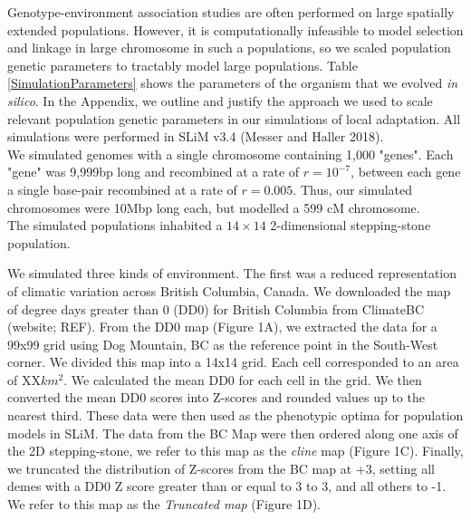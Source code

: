 \documentclass[11pt,twoside,lineno]{GSA_format}
\begin{document}
Genotype-environment association studies are often performed on large spatially extended populations. However, it is computationally infeasible to model selection and linkage in large chromosome in such a populations, so we scaled population genetic parameters to tractably model large populations. Table \ref{SimulationParameters} shows the parameters of the organism that we evolved \textit{in silico}. In the Appendix, we outline and justify the approach we used to scale relevant population genetic parameters in our simulations of local adaptation. All simulations were performed in SLiM v3.4 (Messer and Haller 2018). \\
 
We simulated genomes with a single chromosome containing 1,000 "genes". Each "gene" was 9,999bp long and recombined at a rate of $r = 10^{-7}$, between each gene a single base-pair recombined at a rate of $r = 0.005$. Thus, our simulated chromosomes were 10Mbp long each, but modelled a 599 cM chromosome. \\

The simulated populations inhabited a $14\times14$ 2-dimensional stepping-stone population.


We simulated three kinds of environment. The first was a reduced representation of climatic variation across British Columbia, Canada. We downloaded the map of degree days greater than 0 (DD0) for British Columbia from ClimateBC (website; REF). From the DD0 map (Figure 1A), we extracted the data for a 99x99 grid using Dog Mountain, BC as the reference point in the South-West corner. We divided this map into a 14x14 grid. Each cell corresponded to an area of XX$km^2$. We calculated the mean DD0 for each cell in the grid. We then converted the mean DD0 scores into Z-scores and rounded values up to the nearest third. These data were then used as the phenotypic optima for population models in SLiM. The data from the BC Map were then ordered along one axis of the 2D stepping-stone, we refer to this map as the \textit{cline} map (Figure 1C). Finally, we truncated the distribution of Z-scores from the BC map at +3, setting all demes with a DD0 Z score greater than or equal to 3 to 3, and all others to -1. We refer to this map as the \textit{Truncated map} (Figure 1D).
\end{document}
